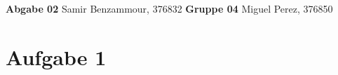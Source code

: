 \documentclass[a4paper, 12pt]{article}
\begin{document}
\title{ }
\noindent \textbf{Abgabe 02} \hfill Samir Benzammour, 376832\n
\noindent \textbf{Gruppe 04} \hfill Miguel Perez, 376850\n

\section*{Aufgabe 1}
\end{document}
